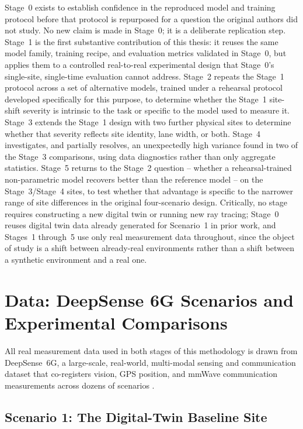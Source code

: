 \documentclass{iutbscthesis}
\begin{document}
Stage~0 exists to establish confidence in the reproduced model and training protocol before that protocol is repurposed for a question the original authors did not study. No new claim is made in Stage~0; it is a deliberate replication step. Stage~1 is the first substantive contribution of this thesis: it reuses the same model family, training recipe, and evaluation metrics validated in Stage~0, but applies them to a controlled real-to-real experimental design that Stage~0's single-site, single-time evaluation cannot address. Stage~2 repeats the Stage~1 protocol across a set of alternative models, trained under a rehearsal protocol developed specifically for this purpose, to determine whether the Stage~1 site-shift severity is intrinsic to the task or specific to the model used to measure it. Stage~3 extends the Stage~1 design with two further physical sites to determine whether that severity reflects site identity, lane width, or both. Stage~4 investigates, and partially resolves, an unexpectedly high variance found in two of the Stage~3 comparisons, using data diagnostics rather than only aggregate statistics. Stage~5 returns to the Stage~2 question -- whether a rehearsal-trained non-parametric model recovers better than the reference model -- on the Stage~3/Stage~4 sites, to test whether that advantage is specific to the narrower range of site differences in the original four-scenario design. Critically, no stage requires constructing a new digital twin or running new ray tracing; Stage~0 reuses digital twin data already generated for Scenario~1 in prior work, and Stages~1 through~5 use only real measurement data throughout, since the object of study is a shift between already-real environments rather than a shift between a synthetic environment and a real one.

\section{Data: DeepSense 6G Scenarios and Experimental Comparisons}
\label{sec:data}

All real measurement data used in both stages of this methodology is drawn from DeepSense~6G, a large-scale, real-world, multi-modal sensing and communication dataset that co-registers vision, GPS position, and mmWave communication measurements across dozens of scenarios \cite{alkhateeb2022deepsense}.

\subsection{Scenario 1: The Digital-Twin Baseline Site}
\end{document}
